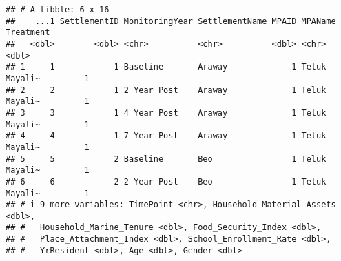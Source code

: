 \documentclass[
]{article}
\begin{document}
\begin{verbatim}
## # A tibble: 6 x 16
##    ...1 SettlementID MonitoringYear SettlementName MPAID MPAName       Treatment
##   <dbl>        <dbl> <chr>          <chr>          <dbl> <chr>             <dbl>
## 1     1            1 Baseline       Araway             1 Teluk Mayali~         1
## 2     2            1 2 Year Post    Araway             1 Teluk Mayali~         1
## 3     3            1 4 Year Post    Araway             1 Teluk Mayali~         1
## 4     4            1 7 Year Post    Araway             1 Teluk Mayali~         1
## 5     5            2 Baseline       Beo                1 Teluk Mayali~         1
## 6     6            2 2 Year Post    Beo                1 Teluk Mayali~         1
## # i 9 more variables: TimePoint <chr>, Household_Material_Assets <dbl>,
## #   Household_Marine_Tenure <dbl>, Food_Security_Index <dbl>,
## #   Place_Attachment_Index <dbl>, School_Enrollment_Rate <dbl>,
## #   YrResident <dbl>, Age <dbl>, Gender <dbl>
\end{verbatim}
\end{document}
